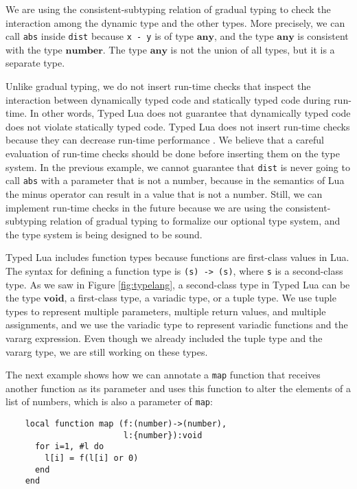 \documentclass[preprint]{sig-alternate}
\newcommand{\Any}{\mathbf{any}}
\newcommand{\Number}{\mathbf{number}}
\newcommand{\Void}{\mathbf{void}}
\begin{document}
We are using the consistent-subtyping relation of gradual
typing to check the interaction among the dynamic type and the other
types.
More precisely, we can call \texttt{abs} inside \texttt{dist} because
\texttt{x - y} is of type $\Any$, and the type $\Any$ is
consistent with the type $\Number$.
The type $\Any$ is not the union of all types, but it is a separate
type.

Unlike gradual typing, we do not insert run-time checks that
inspect the interaction between dynamically typed code and statically
typed code during run-time.
In other words, Typed Lua does not guarantee that dynamically typed
code does not violate statically typed code.
Typed Lua does not insert run-time checks because they can decrease
run-time performance \citep{allende2013cis}.
We believe that a careful evaluation of run-time checks should be done
before inserting them on the type system.
In the previous example, we cannot guarantee that \texttt{dist} is never
going to call \texttt{abs} with a parameter that is not a number,
because in the semantics of Lua the minus operator can result in a
value that is not a number.
Still, we can implement run-time checks in the future because we are
using the consistent-subtyping relation of gradual typing to
formalize our optional type system, and the type system is being
designed to be sound.

Typed Lua includes function types because functions are first-class
values in Lua.
The syntax for defining a function type is \texttt{(s) -> (s)},
where \texttt{s} is a second-class type.
As we saw in Figure \ref{fig:typelang}, a second-class type in
Typed Lua can be the type $\Void$, a first-class type, a variadic
type, or a tuple type.
We use tuple types to represent multiple parameters, multiple return
values, and multiple assignments, and we use the variadic type to
represent variadic functions and the vararg expression.
Even though we already included the tuple type and the vararg type,
we are still working on these types.

The next example shows how we can annotate a \texttt{map} function
that receives another function as its parameter and uses this
function to alter the elements of a list of numbers, which is
also a parameter of \texttt{map}:
\begin{verbatim}
    local function map (f:(number)->(number),
                        l:{number}):void
      for i=1, #l do
        l[i] = f(l[i] or 0)
      end
    end
\end{verbatim}
\end{document}
